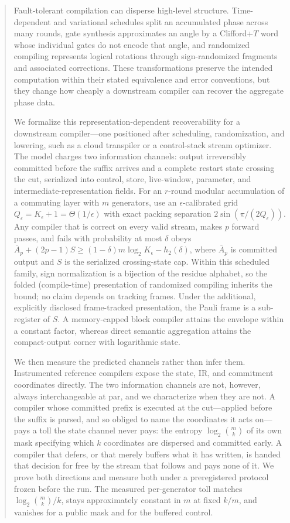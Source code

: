 \documentclass[a4paper,twocolumn,10pt,unpublished]{quantumarticle}
\begin{document}
\begin{abstract}
Fault-tolerant compilation can disperse high-level structure.
Time-dependent and variational schedules split an accumulated phase
across many rounds, gate synthesis approximates an angle by a
Clifford+$T$ word whose individual gates do not encode that angle, and
randomized compiling represents logical rotations through
sign-randomized fragments and associated corrections.  These
transformations preserve the intended computation within their stated
equivalence and error conventions, but they change how cheaply a
downstream compiler can recover the aggregate phase data.

We formalize this representation-dependent recoverability for a
downstream compiler---one positioned after scheduling, randomization,
and lowering, such as a cloud transpiler or a control-stack stream
optimizer.  The model charges two information channels: output
irreversibly committed before the suffix arrives and a complete restart
state crossing the cut, serialized into control, store, live-window,
parameter, and intermediate-representation fields.  For an $r$-round
modular accumulation of a commuting layer with $m$ generators, use an
$\epsilon$-calibrated grid
$Q_\epsilon=K_\epsilon+1=\Theta(1/\epsilon)$ with exact packing
separation $2\sin(\pi/(2Q_\epsilon))$.  Any compiler that is correct on
every valid stream, makes $p$ forward passes, and fails with probability
at most $\delta$ obeys
$\overline A_p+(2p-1)S\geq
(1-\delta)m\log_2K_\epsilon-h_2(\delta)$, where $\overline A_p$ is
committed output and $S$ is the serialized crossing-state cap.
Within this scheduled family, sign normalization is a bijection of the
residue alphabet, so the folded (compile-time) presentation of
randomized compiling inherits the bound; no claim depends on tracking
frames.  Under the additional, explicitly disclosed frame-tracked
presentation, the Pauli frame is a sub-register of $S$.  A
memory-capped block compiler attains the envelope within a constant
factor, whereas direct semantic aggregation attains the compact-output
corner with logarithmic state.

We then measure the predicted channels rather than infer them.
Instrumented reference compilers expose the state, IR, and commitment
coordinates directly.
The two information channels are not, however, always interchangeable
at par, and we characterize when they are not.  A compiler whose committed prefix is
executed at the cut---applied before the suffix is parsed, and so
obliged to name the coordinates it acts on---pays a toll the state
channel never pays: the entropy $\log_2\binom{m}{k}$ of its own
mask specifying which $k$ coordinates are dispersed and committed early.  A compiler that
defers, or that merely buffers what it has written, is handed that
decision for free by the stream that follows and pays none of it.  We
prove both directions and measure both under a preregistered protocol
frozen before the run.  The measured per-generator toll matches
$\log_2\binom{m}{k}/k$, stays approximately constant in $m$ at fixed
$k/m$, and vanishes for a public mask and for the buffered control.


\end{abstract}
\end{document}
